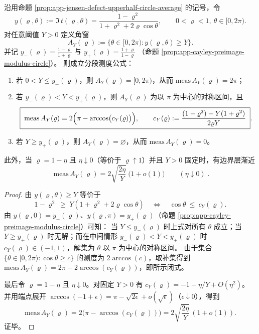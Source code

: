 \begin{proposition}\label{prop:app-jensen-endpoint-angle-window}
沿用命题 \ref{prop:app-jensen-defect-upperhalf-circle-average} 的记号，令
\[
y(\varrho,\theta):=\Im\,t(\varrho,\theta)=\frac{1-\varrho^2}{1+\varrho^2+2\varrho\cos\theta},
\qquad 0<\varrho<1,\ \theta\in[0,2\pi).
\]
对任意阈值 \(Y>0\) 定义角窗
\[
A_Y(\varrho):=\{\theta\in[0,2\pi): y(\varrho,\theta)\ge Y\}.
\]
并记
\(
y_{-}(\varrho)=\frac{1-\varrho}{1+\varrho}
\)
与
\(
y_{+}(\varrho)=\frac{1+\varrho}{1-\varrho}
\)
（命题 \ref{prop:app-cayley-preimage-modulus-circle}）。
则成立分段测度公式：
\begin{enumerate}
  \item 若 \(0<Y\le y_{-}(\varrho)\)，则 \(A_Y(\varrho)=[0,2\pi)\)，从而 \(\mathrm{meas}\,A_Y(\varrho)=2\pi\)；
  \item 若 \(y_{-}(\varrho)<Y<y_{+}(\varrho)\)，则 \(A_Y(\varrho)\) 为以 \(\pi\) 为中心的对称区间，且
  \[
  \boxed{\;
  \mathrm{meas}\,A_Y(\varrho)=2\Bigl(\pi-\arccos\bigl(c_Y(\varrho)\bigr)\Bigr),\qquad
  c_Y(\varrho):=\frac{(1-\varrho^2)-Y(1+\varrho^2)}{2\varrho Y}\; }.
  \]
  \item 若 \(Y\ge y_{+}(\varrho)\)，则 \(A_Y(\varrho)=\varnothing\)，从而 \(\mathrm{meas}\,A_Y(\varrho)=0\)。
\end{enumerate}
此外，当 \(\varrho=1-\eta\) 且 \(\eta\downarrow 0\)（等价于 \(\varrho\uparrow 1\)）并且 \(Y>0\) 固定时，有边界层渐近
\[
\boxed{\;
\mathrm{meas}\,A_Y(\varrho)
=2\sqrt{\frac{2\eta}{Y}}\ \bigl(1+o(1)\bigr)\qquad(\eta\downarrow 0)\; }.
\]
\end{proposition}

\begin{proof}
由 \(y(\varrho,\theta)\ge Y\) 等价于
\[
1-\varrho^2\ \ge\ Y(1+\varrho^2+2\varrho\cos\theta)
\quad\Longleftrightarrow\quad
\cos\theta\ \le\ c_Y(\varrho).
\]
由 \(y(\varrho,0)=y_{-}(\varrho)\)、\(y(\varrho,\pi)=y_{+}(\varrho)\)（命题 \ref{prop:app-cayley-preimage-modulus-circle}）可知：
当 \(Y\le y_{-}(\varrho)\) 时上式对所有 \(\theta\) 成立；当 \(Y\ge y_{+}(\varrho)\) 时无解；而在中间情形 \(y_{-}(\varrho)<Y<y_{+}(\varrho)\) 时 \(c_Y(\varrho)\in(-1,1)\)，解集为 \(\theta\) 以 \(\pi\) 为中心的对称区间。
由于集合 \(\{\theta\in[0,2\pi):\cos\theta\ge c\}\) 的测度为 \(2\arccos(c)\)，取补集得到
\(\mathrm{meas}\,A_Y(\varrho)=2\pi-2\arccos(c_Y(\varrho))\)，即所示闭式。
\par
最后令 \(\varrho=1-\eta\) 且 \(\eta\downarrow 0\)。对固定 \(Y>0\) 有
\(
c_Y(\varrho)=-1+\eta/Y+O(\eta^2)
\)。
并用端点展开 \(\arccos(-1+\epsilon)=\pi-\sqrt{2\epsilon}+o(\sqrt{\epsilon})\)（\(\epsilon\downarrow 0\)），得到
\[
\mathrm{meas}\,A_Y(\varrho)
=2\bigl(\pi-\arccos(c_Y(\varrho))\bigr)
=2\sqrt{\frac{2\eta}{Y}}\,(1+o(1)).
\]
证毕。
\end{proof}

